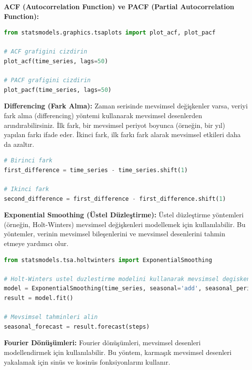 \textbf{ACF (Autocorrelation Function) ve PACF (Partial Autocorrelation Function):}

\begin{lstlisting}[language=Python]
from statsmodels.graphics.tsaplots import plot_acf, plot_pacf

# ACF grafigini cizdirin
plot_acf(time_series, lags=50)

# PACF grafigini cizdirin
plot_pacf(time_series, lags=50)
\end{lstlisting}

\textbf{Differencing (Fark Alma):} Zaman serisinde mevsimsel değişkenler varsa, veriyi fark alma (differencing) yöntemi kullanarak mevsimsel desenlerden arındırabilirsiniz. İlk fark, bir mevsimsel periyot boyunca (örneğin, bir yıl) yapılan farkı ifade eder. İkinci fark, ilk farkı fark alarak mevsimsel etkileri daha da azaltır.

\begin{lstlisting}[language=Python]
# Birinci fark
first_difference = time_series - time_series.shift(1)

# Ikinci fark
second_difference = first_difference - first_difference.shift(1)
\end{lstlisting}

\textbf{Exponential Smoothing (Üstel Düzleştirme):} Üstel düzleştirme yöntemleri (örneğin, Holt-Winters) mevsimsel değişkenleri modellemek için kullanılabilir. Bu yöntemler, verinin mevsimsel bileşenlerini ve mevsimsel desenlerini tahmin etmeye yardımcı olur.

\begin{lstlisting}[language=Python]
from statsmodels.tsa.holtwinters import ExponentialSmoothing

# Holt-Winters ustel duzlestirme modelini kullanarak mevsimsel degiskenleri tahmin edin
model = ExponentialSmoothing(time_series, seasonal='add', seasonal_periods=12)
result = model.fit()

# Mevsimsel tahminleri alin
seasonal_forecast = result.forecast(steps)
\end{lstlisting}

\textbf{Fourier Dönüşümleri:} Fourier dönüşümleri, mevsimsel desenleri modellendirmek için kullanılabilir. Bu yöntem, karmaşık mevsimsel desenleri yakalamak için sinüs ve kosinüs fonksiyonlarını kullanır.

